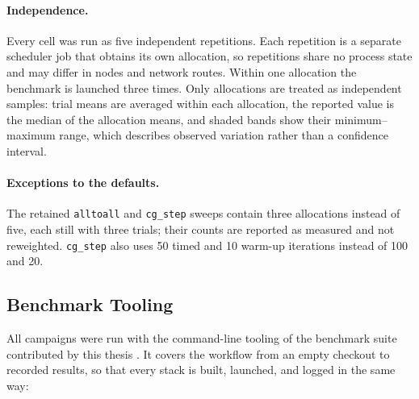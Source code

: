 \paragraph{Independence.} Every cell was run as five independent repetitions. Each repetition is a separate scheduler job that obtains its own allocation, so repetitions share no process state and may differ in nodes and network routes. Within one allocation the benchmark is launched three times. Only allocations are treated as independent samples: trial means are averaged within each allocation, the reported value is the median of the allocation means, and shaded bands show their minimum--maximum range, which describes observed variation rather than a confidence interval.

\paragraph{Exceptions to the defaults.} The retained \texttt{alltoall} and \texttt{cg\_step} sweeps contain three allocations instead of five, each still with three trials; their counts are reported as measured and not reweighted. \texttt{cg\_step} also uses 50 timed and 10 warm-up iterations instead of 100 and 20.

\subsection{Benchmark Tooling}\label{sec:harness}

All campaigns were run with the command-line tooling of the benchmark suite contributed by this thesis \cite{merenda_gpu_comm_benchmark_2026}. It covers the workflow from an empty checkout to recorded results, so that every stack is built, launched, and logged in the same way:

